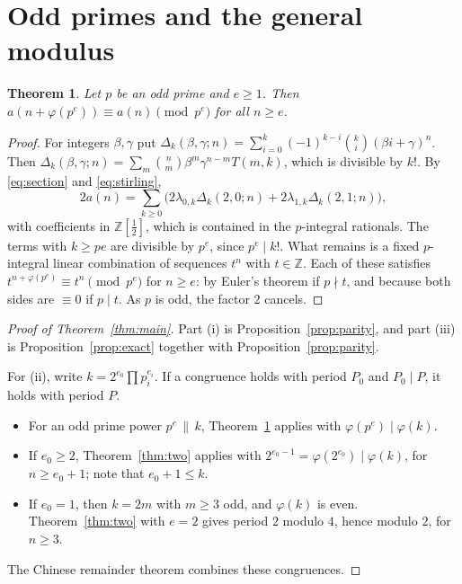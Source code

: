 \documentclass[11pt]{amsart}
\newtheorem{theorem}{Theorem}
\theoremstyle{remark}
\newcommand{\Z}{\mathbb{Z}}
\begin{document}
\section{Odd primes and the general modulus}

\begin{theorem}\label{thm:odd}
Let $p$ be an odd prime and $e\ge1$.
Then $a(n+\varphi(p^e))\equiv a(n)\pmod{p^e}$ for all $n\ge e$.
\end{theorem}

\begin{proof}
For integers $\beta,\gamma$ put $\Delta_k(\beta,\gamma;n)=\sum_{i=0}^k(-1)^{k-i}\binom ki(\beta i+\gamma)^n$.
Then $\Delta_k(\beta,\gamma;n)=\sum_m\binom nm\beta^m\gamma^{n-m}T(m,k)$, which is divisible by $k!$.
By \eqref{eq:section} and \eqref{eq:stirling},
\[
2a(n)=\sum_{k\ge0}\bigl(2\lambda_{0,k}\Delta_k(2,0;n)+2\lambda_{1,k}\Delta_k(2,1;n)\bigr),
\]
with coefficients in $\Z[\frac12]$, which is contained in the $p$-integral rationals.
The terms with $k\ge pe$ are divisible by $p^e$, since $p^e\mid k!$.
What remains is a fixed $p$-integral linear combination of sequences $t^n$ with $t\in\Z$.
Each of these satisfies $t^{n+\varphi(p^e)}\equiv t^n\pmod{p^e}$ for $n\ge e$: by Euler's theorem if $p\nmid t$, and because both sides are $\equiv0$ if $p\mid t$.
As $p$ is odd, the factor $2$ cancels.
\end{proof}

\begin{proof}[Proof of Theorem~\ref{thm:main}]
Part (i) is Proposition~\ref{prop:parity}, and part (iii) is Proposition~\ref{prop:exact} together with Proposition~\ref{prop:parity}.

For (ii), write $k=2^{e_0}\prod p_i^{e_i}$.
If a congruence holds with period $P_0$ and $P_0\mid P$, it holds with period $P$.
\begin{itemize}
\item For an odd prime power $p^e\,\|\,k$, Theorem~\ref{thm:odd} applies with $\varphi(p^e)\mid\varphi(k)$.
\item If $e_0\ge2$, Theorem~\ref{thm:two} applies with $2^{e_0-1}=\varphi(2^{e_0})\mid\varphi(k)$, for $n\ge e_0+1$; note that $e_0+1\le k$.
\item If $e_0=1$, then $k=2m$ with $m\ge3$ odd, and $\varphi(k)$ is even. Theorem~\ref{thm:two} with $e=2$ gives period $2$ modulo $4$, hence modulo $2$, for $n\ge3$.
\end{itemize}
The Chinese remainder theorem combines these congruences.
\end{proof}
\end{document}
